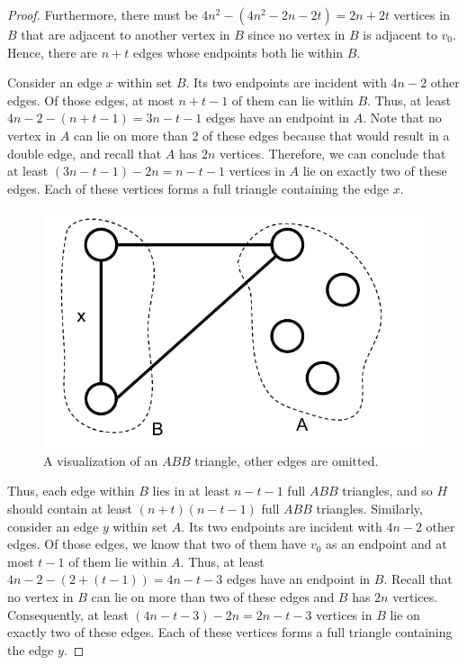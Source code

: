 \documentclass[10pt]{amsart}
\begin{document}
\begin{proof}
    Furthermore, there must be $4n^2 - (4n^2 - 2n - 2t) = 2n + 2t$ vertices in $B$ that are adjacent 
    to another vertex in $B$ since no vertex in $B$ is adjacent to $v_0$. Hence, there are 
    $n + t$ edges whose endpoints both lie within $B$.

    Consider an edge $x$ within set $B$. Its two endpoints are incident with $4n - 2$ other edges. 
    Of those edges, at most $n + t - 1$ of them can lie within $B$. Thus, at least 
    $4n - 2 - (n + t - 1) = 3n - t - 1$ edges have an endpoint in $A$. Note that no vertex in 
    $A$ can lie on more than 2 of these edges because that would result in a double edge, and 
    recall that $A$ has $2n$ vertices. Therefore, we can conclude that at least 
    $(3n - t - 1) - 2n = n - t - 1$ vertices in $A$ lie on exactly two of these edges. Each of 
    these vertices forms a full triangle containing the edge $x$.

    \begin{figure}[h!]
        \centering
        \includegraphics[scale=.7]{../figures/abb_triangle.pdf}
        \caption{A visualization of an $ABB$ triangle, other edges are omitted.}
    \end{figure}

    Thus, each edge within $B$ lies in at least $n - t - 1$ full $ABB$ triangles, and so $H$ should 
    contain at least $(n + t)(n - t - 1)$ full $ABB$ triangles.
    Similarly, consider an edge $y$ within set $A$. Its two endpoints are incident with $4n - 2$ other
    edges. Of those edges, we know that two of them have $v_0$ as an endpoint and at most $t - 1$ of 
    them lie within $A$. Thus, at least $4n - 2 - (2 + (t - 1)) = 4n - t - 3$ edges have an endpoint 
    in $B$. Recall that no vertex in $B$ can lie on more than two of these edges and $B$ has $2n$ 
    vertices. Consequently, at least $(4n - t - 3) - 2n = 2n - t - 3$ vertices in $B$ lie on 
    exactly two of these edges. Each of these vertices forms a full triangle containing the edge $y$.


\end{proof}
\end{document}

